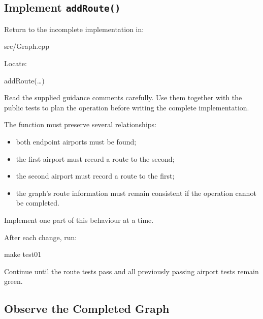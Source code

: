 \documentclass{csc2059practical}
\begin{document}

\subsection{Implement \texttt{addRoute()}}

Return to the incomplete implementation in:

\begin{terminal}
src/Graph.cpp
\end{terminal}

Locate:

\begin{cppcode}
addRoute(…)
\end{cppcode}

Read the supplied guidance comments carefully. Use them together with the public
tests to plan the operation before writing the complete implementation.

The function must preserve several relationships:

\begin{itemize}
\item both endpoint airports must be found;
\item the first airport must record a route to the second;
\item the second airport must record a route to the first;
\item the graph’s route information must remain consistent if the operation
cannot be completed.
\end{itemize}

Implement one part of this behaviour at a time.

After each change, run:

\begin{terminal}
make test01
\end{terminal}

Continue until the route tests pass and all previously passing airport tests
remain green.


\subsection{Observe the Completed Graph}
\end{document}
